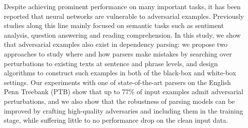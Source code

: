 Despite achieving prominent performance on many important tasks, it has been reported that neural networks are vulnerable to adversarial examples. Previously studies along this line mainly focused on semantic tasks such as sentiment analysis, question answering and reading comprehension. In this study, we show that adversarial examples also exist in dependency parsing: we propose two approaches to study where and how parsers make mistakes by searching over perturbations to existing texts at sentence and phrase levels, and design algorithms to construct such examples in both of the black-box and white-box settings. Our experiments with one of state-of-the-art parsers on the English Penn Treebank (PTB) show that up to 77\% of input examples admit adversarial perturbations, and we also show that the robustness of parsing models can be improved by crafting high-quality adversaries and including them in the training stage, while suffering little to no performance drop on the clean input data.
